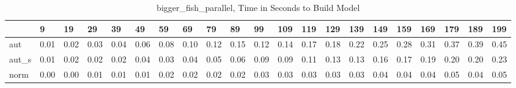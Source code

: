 \begin{table}
\caption{bigger_fish_parallel, Time in Seconds to Build Model}
\label{bigger_fish_parallel_model_time}
\begin{tabular}{lllllllllllllllllllll}
\toprule
 & 9 & 19 & 29 & 39 & 49 & 59 & 69 & 79 & 89 & 99 & 109 & 119 & 129 & 139 & 149 & 159 & 169 & 179 & 189 & 199 \\
\midrule
aut & 0.01 & 0.02 & 0.03 & 0.04 & 0.06 & 0.08 & 0.10 & 0.12 & 0.15 & 0.12 & 0.14 & 0.17 & 0.18 & 0.22 & 0.25 & 0.28 & 0.31 & 0.37 & 0.39 & 0.45 \\
aut_s & 0.01 & 0.02 & 0.02 & 0.02 & 0.04 & 0.03 & 0.04 & 0.05 & 0.06 & 0.09 & 0.09 & 0.11 & 0.13 & 0.13 & 0.16 & 0.17 & 0.19 & 0.20 & 0.20 & 0.23 \\
norm & 0.00 & 0.00 & 0.01 & 0.01 & 0.01 & 0.02 & 0.02 & 0.02 & 0.02 & 0.03 & 0.03 & 0.03 & 0.03 & 0.03 & 0.04 & 0.04 & 0.04 & 0.05 & 0.04 & 0.05 \\
\bottomrule
\end{tabular}
\end{table}
